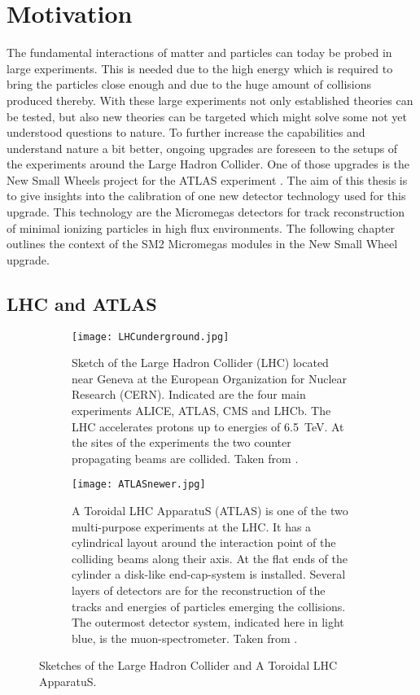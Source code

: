 \documentclass[
twoside,            %
BCOR1.4cm,          %
10pt,               %
headings=normal,    %
headsepline,        %
clearplainpage,		%
final,              %
div=14,
open=right,
bibliography=toc
]{scrreprt}
\begin{document}
\chapter{Motivation}
\setcounter{page}{1}

The fundamental interactions of matter and particles can today be probed in large experiments.
This is needed due to the high energy which is required to bring the particles close enough and due to the huge amount of collisions produced thereby.
With these large experiments not only established theories can be tested, but also new theories can be targeted which might solve some not yet understood questions to nature.
To further increase the capabilities and understand nature a bit better, ongoing upgrades are foreseen to the setups of the experiments around the Large Hadron Collider.
One of those upgrades is the New Small Wheels project for the ATLAS experiment
\cite{atlasCollaboration}.
The aim of this thesis is to give insights into the calibration of one new detector technology used for this upgrade.
This technology are the Micromegas detectors for track reconstruction of minimal ionizing particles in high flux environments.
The following chapter outlines the context of the SM2 Micromegas modules in the New Small Wheel upgrade.

\section{LHC and ATLAS}

\begin{figure}[!h]
	\begin{subfigure}[b]{0.48\textwidth}
		\centering
		\texttt{[image: LHCunderground.jpg]}
		\caption{
			Sketch of the Large Hadron Collider (LHC) located near Geneva at the European Organization for Nuclear Research (CERN). Indicated are the four main experiments ALICE, ATLAS, CMS and LHCb. 
			The LHC accelerates protons up to energies of \SI{6.5}{TeV}. 
			At the sites of the experiments the two counter propagating beams are collided.
			Taken from \cite{LHCoverview}.
		}
		\label{LHCsketch} 
	\end{subfigure}
	\hfill
	\begin{subfigure}[b]{0.48\textwidth}
		\centering
		\texttt{[image: ATLASnewer.jpg]}
		\caption{
			A Toroidal LHC ApparatuS (ATLAS) is one of the two multi-purpose experiments at the LHC. 
			It has a cylindrical layout around the interaction point of the colliding beams along their axis. 
			At the flat ends of the cylinder a disk-like end-cap-system is installed.
			Several layers of detectors are for the reconstruction of the tracks and energies of particles emerging the collisions.
			The outermost detector system, indicated here in light blue, is the muon-spectrometer.
			Taken from \cite{ATLASpicture}.
		}
		\label{ATLAScketch} 
	\end{subfigure}
	\vspace{-2mm}
	\caption{
		Sketches of the Large Hadron Collider and A Toroidal LHC ApparatuS. 
	}
\end{figure}
\end{document}
